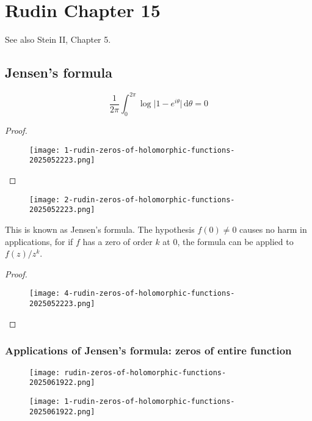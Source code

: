 \section{Rudin Chapter 15}

See also Stein II, Chapter 5.

\subsection{Jensen's formula}

\begin{lemma}
\[
\frac{1}{2\pi}\int_{0}^{2\pi} \log \lvert 1-e^{ i\theta } \rvert  \, \mathrm{d}\theta=0 
\]
\end{lemma}
\begin{proof}
\begin{figure}[H]
\centering
\texttt{[image: 1-rudin-zeros-of-holomorphic-functions-2025052223.png]}
\label{}
\end{figure}
\end{proof}

\begin{figure}[H]
\centering
\texttt{[image: 2-rudin-zeros-of-holomorphic-functions-2025052223.png]}
\label{}
\end{figure}

\begin{note}
This is known as Jensen's formula. The hypothesis $f(0) \neq 0$ causes no harm in applications, for if $f$ has a zero of order $k$ at $0$, the formula can be applied to $f(z)/z^k$.
\end{note}
\begin{proof}
\begin{figure}[H]
\centering
\texttt{[image: 4-rudin-zeros-of-holomorphic-functions-2025052223.png]}
\label{}
\end{figure}
\end{proof}

\subsubsection{Applications of Jensen's formula: zeros of entire function}

\begin{figure}[H]
\centering
\texttt{[image: rudin-zeros-of-holomorphic-functions-2025061922.png]}
\label{}
\end{figure}
\begin{figure}[H]
\centering
\texttt{[image: 1-rudin-zeros-of-holomorphic-functions-2025061922.png]}
\label{}
\end{figure}
